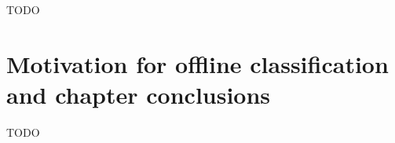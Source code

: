 

TODO

\section{Motivation for offline classification and chapter conclusions}
\label{sec:processing_signals_summary}


TODO